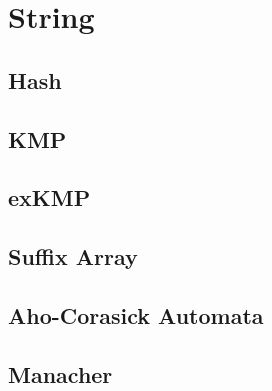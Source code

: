 \section{String}

\subsection{Hash}


\subsection{KMP}


\subsection{exKMP}


\subsection{Suffix Array}


\subsection{Aho-Corasick Automata}


\subsection{Manacher}

